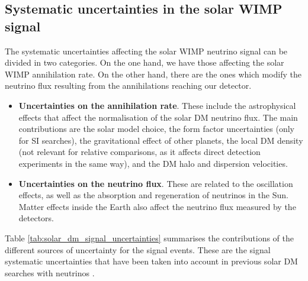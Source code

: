 \subsection{Systematic uncertainties in the solar WIMP signal}

The systematic uncertainties affecting the solar WIMP neutrino signal can be divided in two categories. On the one hand, we have those affecting the solar WIMP annihilation rate. On the other hand, there are the ones which modify the neutrino flux resulting from the annihilations reaching our detector.

\begin{itemize}
	\item \textbf{Uncertainties on the annihilation rate}. These include the astrophysical effects that affect the normalisation of the solar DM neutrino flux. The main contributions are the solar model choice, the form factor uncertainties (only for SI searches), the gravitational effect of other planets, the local DM density (not relevant for relative comparisons, as it affects direct detection experiments in the same way), and the DM halo and dispersion velocities.
	\item \textbf{Uncertainties on the neutrino flux}. These are related to the oscillation effects, as well as the absorption and regeneration of neutrinos in the Sun. Matter effects inside the Earth also affect the neutrino flux measured by the detectors.
\end{itemize}

Table \ref{tab:solar_dm_signal_uncertainties} summarises the contributions of the different sources of uncertainty for the signal events. These are the signal systematic uncertainties that have been taken into account in previous solar DM searches with neutrinos \cite{Boliev2013,Super-Kamiokande2015,Principato2021}.

